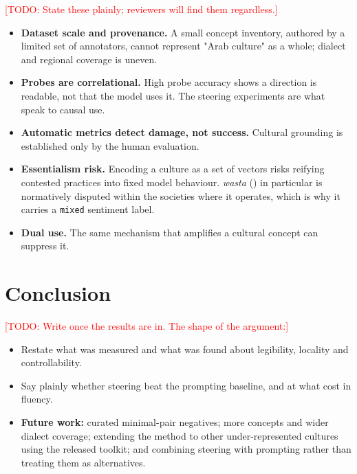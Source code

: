 \documentclass[11pt,a4paper]{article}
\newcommand{\todo}[1]{\textcolor{red}{[TODO: #1]}}
\newcommand{\arabterm}[2]{\emph{#1} (#2)}
\begin{document}
\todo{State these plainly; reviewers will find them regardless.}
\begin{itemize}
  \item \textbf{Dataset scale and provenance.} A small concept inventory,
        authored by a limited set of annotators, cannot represent "Arab
        culture" as a whole; dialect and regional coverage is uneven.
  \item \textbf{Probes are correlational.} High probe accuracy shows a
        direction is readable, not that the model uses it. The steering
        experiments are what speak to causal use.
  \item \textbf{Automatic metrics detect damage, not success.} Cultural
        grounding is established only by the human evaluation.
  \item \textbf{Essentialism risk.} Encoding a culture as a set of vectors
        risks reifying contested practices into fixed model behaviour.
        \arabterm{wasta}{} in particular is normatively disputed within the
        societies where it operates, which is why it carries a \texttt{mixed}
        sentiment label.
  \item \textbf{Dual use.} The same mechanism that amplifies a cultural concept
        can suppress it.
\end{itemize}

\section{Conclusion}
\label{sec:conclusion}

\todo{Write once the results are in. The shape of the argument:}
\begin{itemize}
  \item Restate what was measured and what was found about legibility,
        locality and controllability.
  \item Say plainly whether steering beat the prompting baseline, and at what
        cost in fluency.
  \item \textbf{Future work:} curated minimal-pair negatives; more concepts and
        wider dialect coverage; extending the method to other
        under-represented cultures using the released toolkit; and combining
        steering with prompting rather than treating them as alternatives.
\end{itemize}

\end{document}
